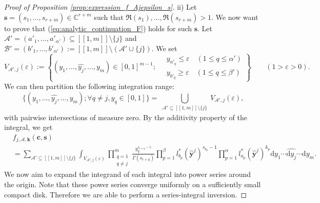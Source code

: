 \documentclass[10pt,a4paper]{amsart}
\newcommand{\dd}{\mathrm{d}}
\begin{document}
\begin{proof}[Proof of Proposition \ref{prop:expression_f_Ajepsilon_s}]
ii) Let $\mathbf{s}=(s_1,\ldots,s_{r+m}) \in \mathbb{C}^{r+m}$ such that $\Re(s_1),\ldots,\Re(s_{r+m})>1$. We now want to prove that (\ref{eq:analytic_continuation_F}) holds for such $\mathbf{s}$. Let $\mathcal{A}'=(a'_1,\ldots,a'_{\alpha'}) \subseteq [\![ 1,m ]\!] \setminus \{ j \}$ and $\mathcal{B}'=(b'_1,\ldots,b'_{\alpha'}) := [\![ 1,m ]\!] \setminus ( \mathcal{A}' \cup \{ j \})$. We set
\[
    V_{\mathcal{A}',j}(\varepsilon):= \left\{ (y_1,\ldots,\widehat{y_{j}},\ldots,y_{m}) \in [0,1]^{m-1} ; \
    \begin{aligned} 
        &y_{a'_q} \leq \varepsilon \quad (1 \leq q \leq \alpha') \\
        &y_{b'_q} \geq \varepsilon \quad (1 \leq q \leq \beta')
    \end{aligned}
    \right\} \qquad (1>\varepsilon>0). 
\]
We can then partition the following integration range:
$$ \{ (y_1,\ldots,\widehat{y_j},\ldots,y_{m}); \forall q \neq j, y_q \in [0,1] \} = \bigcup_{\substack{\mathcal{A}' \subseteq [\![1,m]\!] \setminus \{ j \}}} V_{\mathcal{A}',j}(\varepsilon), $$
with pairwise intersections of measure zero. By the additivity property of the integral, we get
\begin{align}
    &f_{j,\mathcal{A},\mathbf{k}}(\mathbf{c},\mathbf{s}) \nonumber \\
    &= \sum_{\mathcal{A}' \subseteq [\![1,m]\!] \setminus \{ j \}} \int_{V_{\mathcal{A}',j}(\varepsilon)} \prod_{\substack{q=1 \\ q \neq j}}^{m} \frac{y_q^{s_{r+q}-1}}{\Gamma(s_{r+q})} \prod_{p=1}^{\beta} l^*_{b_p}(\widehat{\mathbf{y}}^j)^{s_{b_p}-1} \prod_{p=1}^{\alpha} l^*_{a_p}(\widehat{\mathbf{y}}^j)^{k_p} \dd y_1 \cdots \widehat{\dd y_{j}} \cdots \dd y_{m}. \label{eq:expression_chasles_f_Ajepsilon_(s)}
\end{align}
We now aim to expand the integrand of each integral into power series around the origin. Note that these power series converge uniformly on a sufficiently small compact disk. Therefore we are able to perform a series-integral inversion.


\end{proof}
\end{document}
